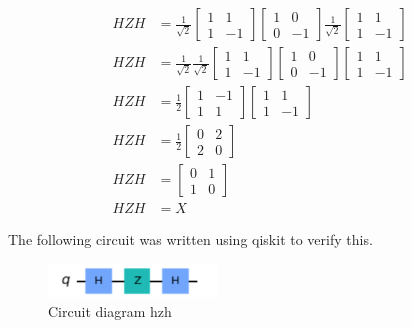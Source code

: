\begin{equation*} 
\begin{split}
HZH & = \tfrac{1}{\sqrt{2}}\begin{bmatrix} 1 & 1 \\ 1 & -1 \end{bmatrix} \begin{bmatrix} 1 & 0 \\ 0 & -1 \end{bmatrix}\tfrac{1}{\sqrt{2}}\begin{bmatrix} 1 & 1 \\ 1 & -1 \end{bmatrix} \\
HZH & = \tfrac{1}{\sqrt{2}}\tfrac{1}{\sqrt{2}}\begin{bmatrix} 1 & 1 \\ 1 & -1 \end{bmatrix} \begin{bmatrix} 1 & 0 \\ 0 & -1 \end{bmatrix}\begin{bmatrix} 1 & 1 \\ 1 & -1 \end{bmatrix} \\
HZH & = \tfrac{1}{2}\begin{bmatrix} 1 & -1 \\ 1 & 1 \end{bmatrix}\begin{bmatrix} 1 & 1 \\ 1 & -1 \end{bmatrix}\\
HZH & = \tfrac{1}{2}\begin{bmatrix} 0 & 2 \\ 2 & 0 \end{bmatrix} \\
HZH & = \begin{bmatrix} 0 & 1 \\ 1 & 0 \end{bmatrix} \\
HZH & = X
\end{split}
\end{equation*}

The following circuit was written using qiskit to verify this.

\begin{figure}[h]
    \centering
    \includegraphics[width=0.4\textwidth]{lab2/hzhCircuit.png}
    \caption{Circuit diagram hzh} 
    \label{fig:hzhCircuit}
\end{figure}

